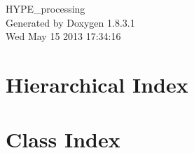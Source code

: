 \documentclass{book}
\begin{document}
\hypersetup{pageanchor=false,citecolor=blue}
\begin{titlepage}
\vspace*{7cm}
\begin{center}
{\Large H\-Y\-P\-E\-\_\-processing }\\
\vspace*{1cm}
{\large Generated by Doxygen 1.8.3.1}\\
\vspace*{0.5cm}
{\small Wed May 15 2013 17:34:16}\\
\end{center}
\end{titlepage}
\clearemptydoublepage
{}
\tableofcontents
\clearemptydoublepage
{}
\hypersetup{pageanchor=true,citecolor=blue}
\chapter{Hierarchical Index}

\chapter{Class Index}

\end{document}
